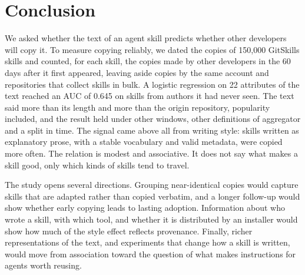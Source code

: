 \section{Conclusion}\label{conclusion}

We asked whether the text of an agent skill predicts whether other
developers will copy it. To measure copying reliably, we dated the
copies of 150,000 GitSkills skills and counted, for each skill, the
copies made by other developers in the 60 days after it first appeared,
leaving aside copies by the same account and repositories that collect
skills in bulk. A logistic regression on 22 attributes of the text
reached an AUC of 0.645 on skills from authors it had never seen. The
text said more than its length and more than the origin repository,
popularity included, and the result held under other windows, other
definitions of aggregator and a split in time. The signal came above all
from writing style: skills written as explanatory prose, with a stable
vocabulary and valid metadata, were copied more often. The relation is
modest and associative. It does not say what makes a skill good, only
which kinds of skills tend to travel.

The study opens several directions. Grouping near-identical copies would
capture skills that are adapted rather than copied verbatim, and a
longer follow-up would show whether early copying leads to lasting
adoption. Information about who wrote a skill, with which tool, and
whether it is distributed by an installer would show how much of the
style effect reflects provenance. Finally, richer representations of the
text, and experiments that change how a skill is written, would move
from association toward the question of what makes instructions for
agents worth reusing.
